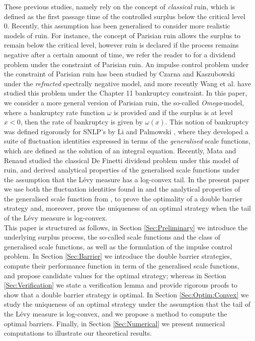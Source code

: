 \documentclass[11pt,reqno]{amsart}
\begin{document}
These previous studies, namely \cite{JS1995,loeffen2009,Paulsen2007} rely on the concept of \textit{classical} ruin, which is defined as the first passage time of the controlled surplus below  the critical level 0. Recently, this assumption has been generalised to consider more realistic models of ruin. For instance, the concept of Parisian ruin allows the surplus to remain below the critical level, however ruin is declared if the process remains negative after a certain amount of time, we refer the reader to \cite{renaud2019} for a dividend problem under the constraint of Parisian ruin. An impulse control problem under the constraint of Parisian ruin has been studied by Czarna and Kaszubowski \cite{CK2020} under the \textit{refracted} spectrally negative model, and more recently Wang et al. \cite{Wang2024} have studied this problem under the Chapter 11 bankruptcy constraint. In this paper, we consider a more general version of Parisian ruin, the so-called \textit{Omega}-model, where a bankruptcy rate function $\omega$ is provided and if the surplus is at level $x < 0$, then the rate of bankruptcy is given by $\omega(x)$. This notion of bankruptcy was defined rigorously for SNLP's by Li and Palmowski \cite{li-palmowski_2018}, where they developed a suite of fluctuation identities expressed in terms of the \textit{generalised} scale functions, which are defined as the solution of an integral equation. Recently, Mata and Renaud \cite{mata-renaud_2024} studied the classical De Finetti dividend problem under this model of ruin, and derived analytical properties of the generalised scale functions under the assumption that the L\'evy measure has a log-convex tail. In the present paper we use both the fluctuation identities found in \cite{li-zhou_2014} and the analytical properties of the generalised scale function from \cite{mata-renaud_2024}, to prove the optimality of a double barrier strategy and, moreover, prove the uniqueness of an optimal strategy when the tail of the L\'evy measure is log-convex.\\
This paper is structured as follows, in Section \ref{Sec:Preliminary} we introduce the underlying surplus process, the so-called scale functions and the class of generalised scale functions, as well as the formulation of the impulse control problem. In Section \ref{Sec:Barrier} we introduce the double barrier strategies, compute their performance function in term of the generalised scale functions, and propose candidate values for the optimal strategy; whereas in Section \ref{Sec:Verification} we state a verification lemma and provide rigorous proofs to show that a double barrier strategy is optimal. In Section \ref{Sec:Optim:Convex} we study the uniqueness of an optimal strategy under the assumption that the tail of the L\'evy measure is log-convex, and we propose a method to compute the optimal barriers. Finally, in Section \ref{Sec:Numerical} we present numerical computations to illustrate our theoretical results. 
\end{document}
